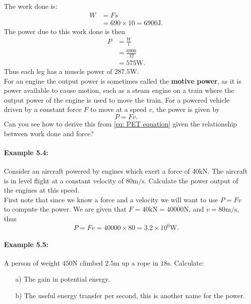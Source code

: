 \documentclass[a4paper,12pt]{book}
\begin{document}
The work done is:
\begin{align*}
W	&=Fs\\
	&=690\times 10=6900 \text{J}.
\end{align*}
The power due to this work done is then
\begin{align*}
P&=\frac{W}{t}\\
	&=\frac{6900}{12}\\
	&=575\text{W}.
\end{align*}
Thus each leg has a muscle power of $287.5\text{W}$.\\

For an engine the output power is sometimes called the \textbf{motive power}, as it is power available to cause motion, such as a steam engine on a train where the output power of the engine is used to move the train. For a powered vehicle driven by a constant force $F$ to move at a speed $v$, the power is given by
\begin{equation*}
P=Fv.
\end{equation*}
Can you see how to derive this from \cref{eq: PET equation} given the relationship between work done and force?

\paragraph{Example 5.4:} Consider an aircraft powered by engines which exert a force of $40\text{kN}$. The aircraft is in level flight at a constant velocity of $80\text{m/s}$. Calculate the power output of the engines at this speed.\\

First note that since we know a force and a velocity we will want to use $P=Fv$ to compute the power. We are given that $F=40\text{kN}=40000\text{N}$, and $v=80\text{m/s}$, thus
\begin{equation*}
P=Fv=40000\times 80 = 3.2\times 10^{6}\text{W}.
\end{equation*}


\paragraph{Example 5.5:} A person of weight $450\text{N}$ climbed $2.5\text{m}$ up a rope in $18\text{s}$. Calculate:
\begin{itemize}
\setlength{\itemsep}{-5pt}
    \item[a)] The gain in potential energy.
    \item[b)] The useful energy transfer per second, this is another name for the power.
\end{itemize} 
\end{document}
